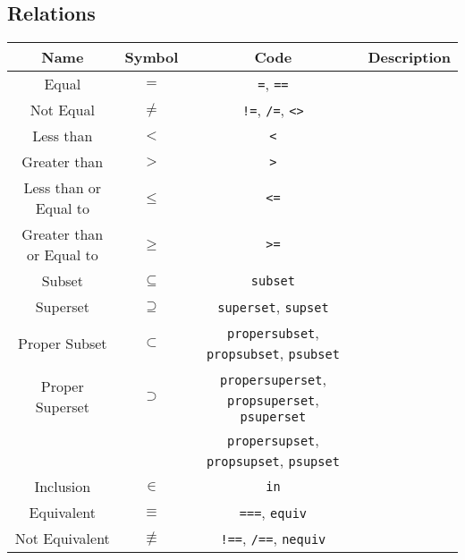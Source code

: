 \documentclass{article}
\begin{document}
  \newpage
  
  \subsection{Relations} %
  \label{sub:relations}
  \begin{table}[!h]
    \centering
    \begin{tabular}{|c|c|c|l|}
      \hline
      \textbf{Name} & \textbf{Symbol} & \textbf{Code} & \textbf{Description} \\
      \hline\hline
      
      Equal & \( = \) & \texttt{=}, \texttt{==} & \\
      Not Equal & \( \ne \) & \texttt{!=}, \texttt{/=}, \texttt{<>} & \\
      Less than & \( < \) & \texttt{<} & \\
      Greater than & \( > \) & \texttt{>} & \\
      Less than or Equal to & \( \le \) & \texttt{<=} & \\
      Greater than or Equal to & \( \ge \) & \texttt{>=} & \\
      Subset & \( \subseteq \) & \texttt{subset} & \\
      Superset & \( \supseteq \) & \texttt{superset}, \texttt{supset} & \\
      Proper Subset & \( \subset \) & \texttt{propersubset}, \texttt{propsubset}, \texttt{psubset} & \\
      Proper Superset & \( \supset \) & \texttt{propersuperset}, \texttt{propsuperset}, \texttt{psuperset} & \\
            & & \texttt{propersupset}, \texttt{propsupset}, \texttt{psupset} & \\
      Inclusion & \( \in \) & \texttt{in} & \\
      Equivalent & \( \equiv \) & \texttt{===}, \texttt{equiv} & \\
      Not Equivalent & \( \not\equiv \) & \texttt{!==}, \texttt{/==}, \texttt{nequiv} & \\
      \hline
    \end{tabular}
  \end{table}
  
\end{document}
